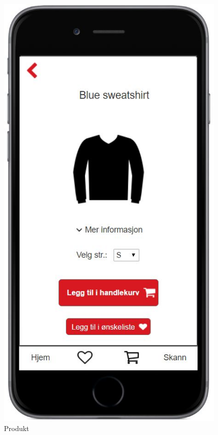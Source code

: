 \begin{figure}[H]
\includegraphics[scale=0.55]{images/axurebilder/genser}
\centering %
\caption{Produkt}
\label{fig:genser}
\end{figure}

